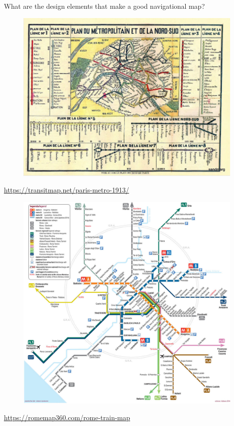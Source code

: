 \documentclass[aspectratio=169]{beamer}
\begin{document}
\begin{frame}
	
	What are the design elements that make a good navigational map?
	
\end{frame}


%	
%	
%	
%
%
%	


\begin{frame}
	
		\begin{figure}
			\centering
			\includegraphics[width=0.8\linewidth]{images/paris_1913.png}
		\end{figure}
		
		\tiny \url{https://transitmap.net/paris-metro-1913/}
	
\end{frame}






\begin{frame}
	
	\begin{figure}
		\centering
		\includegraphics[width=0.6\linewidth]{images/rome-train-map.jpeg}
	\end{figure}
	
	\tiny \url{https://romemap360.com/rome-train-map}
	
\end{frame}
\end{document}
